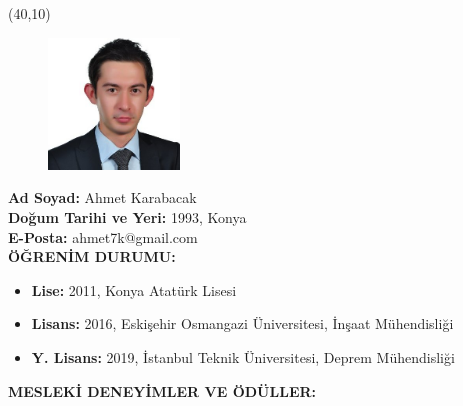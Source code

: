\vspace{10mm}

\noindent %

\newsavebox{\mysquare}
\savebox{\mysquare}{\textcolor{black}{\rule[2.3pt]{3.4pt}{3.4pt}}}

\setlength{\TPHorizModule}{10pt}
\setlength{\TPVertModule}{10pt}

\begin{textblock}{1}(40,10)
 	\begin{figure}[p]
		\includegraphics[width=3.5cm,keepaspectratio=true]{./fig/CV.jpg}
	\end{figure}
\end{textblock}

\noindent \textbf{Ad Soyad:} Ahmet Karabacak \\

\vspace{-3mm}
 \textbf{Doğum Tarihi ve Yeri:} 1993, Konya \\

\vspace{-3mm}
 \textbf{E-Posta:} ahmet7k@gmail.com \\

\textbf{ÖĞRENİM DURUMU:} \vspace{-3mm}

\begin{itemize}
\item \textbf{Lise:} 2011, Konya Atatürk Lisesi 
\item \textbf{Lisans:} 2016, Eskişehir Osmangazi Üniversitesi, İnşaat Mühendisliği 
\item \textbf{Y. Lisans:} 2019, İstanbul Teknik Üniversitesi, Deprem Mühendisliği
\end{itemize}
\textbf{MESLEKİ DENEYİMLER VE ÖDÜLLER:} \vspace{-3mm}


